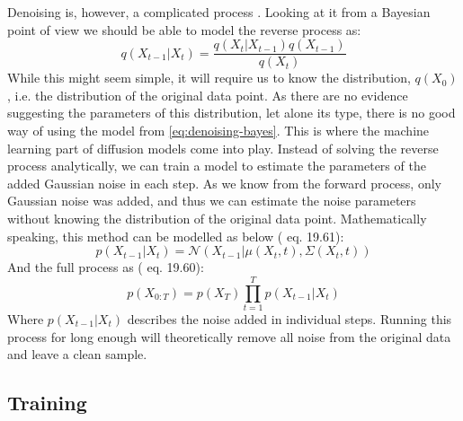 \documentclass[a4paper, 12pt]{olplainarticle}
\begin{document}
Denoising is, however, a complicated process \citep{intro-diffusion-process}. Looking at it from a Bayesian point of view we should be able to model the reverse process as:
\begin{equation} \label{eq:denoising-bayes}
    q(X_{t-1}|X_t) = \frac{q(X_t|X_{t-1}) q(X_{t-1})}{q(X_t)}
\end{equation}
While this might seem simple, it will require us to know the distribution, $q(X_0)$, i.e. the distribution of the original data point.
As there are no evidence suggesting the parameters of this distribution, let alone its type, there is no good way of using the model from \cref{eq:denoising-bayes}.
This is where the machine learning part of diffusion models come into play. 
Instead of solving the reverse process analytically, we can train a model to estimate the parameters of the added Gaussian noise in each step.
As we know from the forward process, only Gaussian noise was added, and thus we can estimate the noise parameters without knowing the distribution of the original data point.
Mathematically speaking, this method can be modelled as below (\cite{ml-book} eq. 19.61):
\begin{equation}
    p(X_{t-1}|X_t) = \mathcal{N}(X_{t-1}|\mu(X_t,t), \Sigma(X_t, t))
\end{equation}
And the full process as (\cite{ml-book} eq. 19.60):
\begin{equation}
    p(X_{0:T}) = p(X_T)\prod_{t=1}^{T}p(X_{t-1}|X_t)
\end{equation}
Where $p(X_{t-1}|X_t)$ describes the noise added in individual steps. 
Running this process for long enough will theoretically remove all noise from the original data and leave a clean sample.

\subsection*{Training}
\end{document}
